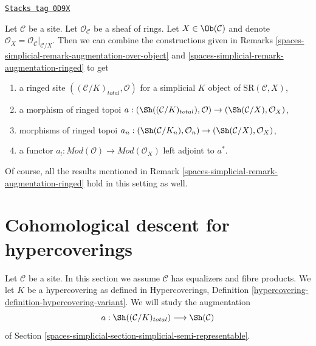 \begin{remark}

\label{spaces-simplicial-remark-augmentation-ringed-over-object}
\href{https://stacks.math.columbia.edu/tag/0D9X}{\texttt{Stacks tag 0D9X}}

Let $\mathcal{C}$ be a site. Let $\mathcal{O}_\mathcal{C}$ be a sheaf of rings.
Let $X \in \Ob(\mathcal{C})$ and denote
$\mathcal{O}_X = \mathcal{O}_\mathcal{C}|_{\mathcal{C}/X}$.
Then we can combine the constructions given in
Remarks \ref{spaces-simplicial-remark-augmentation-over-object} and
\ref{spaces-simplicial-remark-augmentation-ringed}
to get
\begin{enumerate}
\item a ringed site $((\mathcal{C}/K)_{total}, \mathcal{O})$
for a simplicial $K$ object of $\text{SR}(\mathcal{C}, X)$,
\item a morphism of ringed topoi
$a : (\Sh((\mathcal{C}/K)_{total}), \mathcal{O}) \to
(\Sh(\mathcal{C}/X), \mathcal{O}_X)$,
\item morphisms of ringed topoi
$a_n : (\Sh(\mathcal{C}/K_n), \mathcal{O}_n) \to
(\Sh(\mathcal{C}/X), \mathcal{O}_X)$,
\item a functor
$a_! : \textit{Mod}(\mathcal{O}) \to \textit{Mod}(\mathcal{O}_X)$
left adjoint to $a^*$.
\end{enumerate}
Of course, all the results mentioned in
Remark \ref{spaces-simplicial-remark-augmentation-ringed}
hold in this setting as well.
\end{remark}

\section{Cohomological descent for hypercoverings}
\label{spaces-simplicial-section-cohomological-descent-hypercoverings}
Let $\mathcal{C}$ be a site. In this section we assume $\mathcal{C}$
has equalizers and fibre products. We let $K$ be a hypercovering
as defined in Hypercoverings, Definition
\ref{hypercovering-definition-hypercovering-variant}. We will study
the augmentation
$$
a : \Sh((\mathcal{C}/K)_{total}) \longrightarrow \Sh(\mathcal{C})
$$
of Section \ref{spaces-simplicial-section-simplicial-semi-representable}.

